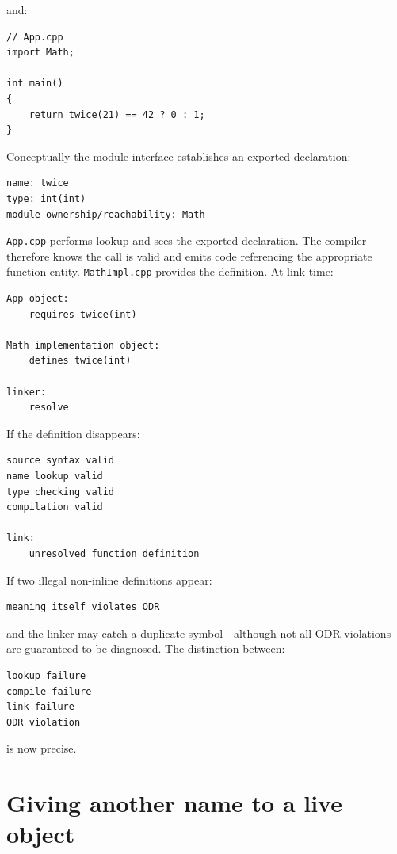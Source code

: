 and:

\begin{verbatim}
// App.cpp
import Math;

int main()
{
    return twice(21) == 42 ? 0 : 1;
}
\end{verbatim}

Conceptually the module interface establishes an exported declaration:

\begin{verbatim}
name: twice
type: int(int)
module ownership/reachability: Math
\end{verbatim}

\texttt{App.cpp} performs lookup and sees the exported declaration. The compiler therefore knows the call is valid and emits code referencing the appropriate function entity. \texttt{MathImpl.cpp} provides the definition. At link time:

\begin{verbatim}
App object:
    requires twice(int)

Math implementation object:
    defines twice(int)

linker:
    resolve
\end{verbatim}

If the definition disappears:

\begin{verbatim}
source syntax valid
name lookup valid
type checking valid
compilation valid

link:
    unresolved function definition
\end{verbatim}

If two illegal non-inline definitions appear:

\begin{verbatim}
meaning itself violates ODR
\end{verbatim}

and the linker may catch a duplicate symbol---although not all ODR violations are guaranteed to be diagnosed. The distinction between:

\begin{verbatim}
lookup failure
compile failure
link failure
ODR violation
\end{verbatim}

is now precise.

\section{Giving another name to a live object}\label{01-foundations-i-ch003-giving-another-name-to-a-live-object}

